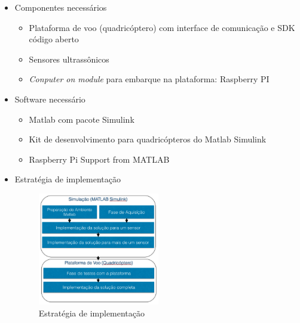 \documentclass{beamer}
\begin{document}
\begin{frame}[allowframebreaks]
\begin{itemize}
		\item Componentes necessários
		\begin{itemize}	
			
			\item Plataforma de voo (quadricóptero) com interface de comunicação e SDK código aberto
			
			\item Sensores ultrassônicos
			
			\item \textit{Conputer on module} para embarque na plataforma: Raspberry PI
				
		\end{itemize}
		
		\item Software necessário
		\begin{itemize}	
			
			\item Matlab com pacote Simulink
			
			\item Kit de desenvolvimento para quadricópteros do Matlab Simulink
			
			\item Raspberry Pi Support from MATLAB
			
		\end{itemize}
	
	\framebreak	
		
		\item Estratégia de implementação
		
		\begin{figure}[h]
			\centering
			\includegraphics[keepaspectratio = true,
			width=0.5\textwidth]{img/fluxo.png}
			\caption{Estratégia de implementação}
			\label{fig:Fluxo}
		\end{figure}
			
	\end{itemize}	 
	
\end{frame}
\end{document}

